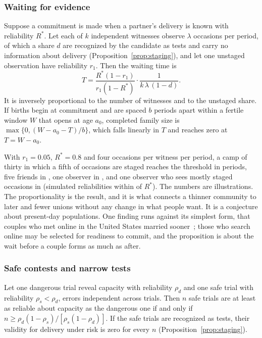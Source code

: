 \subsubsection{Waiting for evidence}
\begin{proposition}\label{prop:waiting}
Suppose a commitment is made when a partner's delivery is known with reliability $R^*$. Let each of $k$ independent
witnesses observe $\lambda$ occasions per period, of which a share $d$ are recognized by the candidate as tests and carry
no information about delivery (Proposition~\ref{prop:staging}), and let one unstaged observation have reliability $r_1$.
Then the waiting time is
\begin{equation}
T=\frac{R^*(1-r_1)}{r_1(1-R^*)}\cdot\frac{1}{k\,\lambda\,(1-d)}.\label{eq:waiting}
\end{equation}
It is inversely proportional to the number of witnesses and to the unstaged share. If births begin at commitment and are
spaced $b$ periods apart within a fertile window $W$ that opens at age $a_0$, completed family size is
$\max\{0,(W-a_0-T)/b\}$, which falls linearly in $T$ and reaches zero at $T=W-a_0$.
\end{proposition}

With $r_1=0.05$, $R^*=0.8$ and four occasions per witness per period, a camp of thirty in which a fifth of occasions are
staged reaches the threshold in \NtWaitCamp{} periods, five friends in \NtWaitFive, one observer in \NtWaitOne, and one
observer who sees mostly staged occasions in \NtWaitOneStaged{} (simulated reliabilities within \NtWaitErr{} of $R^*$).
The numbers are illustrations. The proportionality is the result, and it is what connects a thinner community to later
and fewer unions without any change in what people want. It is a conjecture about present-day populations. One finding
runs against its simplest form, that couples who met online in the United States married sooner~\cite{rosenfeld2017}; those
who search online may be selected for readiness to commit, and the proposition is about the wait before a couple forms as
much as after.

\subsubsection{Safe contests and narrow tests}
\begin{corollary}\label{cor:ritual}
Let one dangerous trial reveal capacity with reliability $\rho_d$ and one safe trial with reliability $\rho_s<\rho_d$,
errors independent across trials. Then $n$ safe trials are at least as reliable about capacity as the dangerous one if and
only if $n\ge\rho_d(1-\rho_s)/[\rho_s(1-\rho_d)]$. If the safe trials are recognized as tests, their validity for
delivery under risk is zero for every $n$ (Proposition~\ref{prop:staging}).
\end{corollary}

